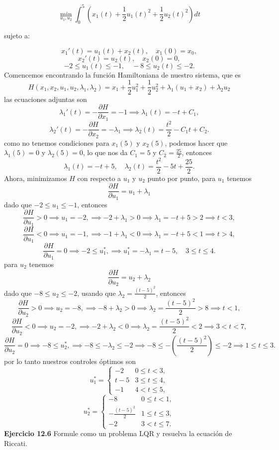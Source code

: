 \documentclass{uofa-eng-assignment}
\begin{document}
\[
\min_{u_1, u_2} \int_0^5 \left( x_1(t) + \frac{1}{2} u_1(t)^2 + \frac{1}{2} u_2(t)^2 \right) dt
\]

sujeto a:

\[
x_1'(t) = u_1(t) + x_2(t), \quad x_1(0) = x_0,
\]
\[
x_2'(t) = u_2(t), \quad x_2(0) = 0,
\]
\[
-2 \leq u_1(t) \leq -1, \quad -8 \leq u_2(t) \leq -2.
\]
Comencemos encontrando la función Hamiltoniana de nuestro sistema, que es
\[
H(x_1, x_2, u_1, u_2, \lambda_1, \lambda_2) = x_1 + \frac{1}{2}u_1^2 + \frac{1}{2}u_2^2 + \lambda_1(u_1 + x_2) + \lambda_2 u_2
\]
las ecuaciones adjuntas son
\[
\lambda_1'(t) = -\frac{\partial H}{\partial x_1} = -1 \implies \lambda_1(t) = -t + C_1,
\]
\[
\lambda_2'(t) = -\frac{\partial H}{\partial x_2} = -\lambda_1 \implies \lambda_2(t) = \frac{t^2}{2} - C_1 t + C_2.
\]
como no tenemos condiciones para $x_1(5)$ y $x_2(5)$, podemos hacer que $\lambda_1(5) = 0$ y $\lambda_2(5) = 0$, lo que nos da $C_1 = 5$ y $C_2 = \frac{25}{2}$, entonces
\[\lambda_1(t) = -t + 5, \quad \lambda_2(t) = \frac{t^2}{2} - 5t + \frac{25}{2}.\]
Ahora, minimizamos $H$ con respecto a $u_1$ y $u_2$ punto por punto, para $u_1$ tenemos
\[\frac{\partial H}{\partial u_1} = u_1 + \lambda_1\]
 dado que $-2 \leq u_1 \leq -1$, entonces
\[\frac{\partial H}{\partial u_1} >  0 \implies u_1= -2, \implies -2 + \lambda_1 > 0 \implies \lambda_1 = -t + 5 > 2 \implies t < 3,\]
\[\frac{\partial H}{\partial u_1} < 0 \implies u_1 = -1, \implies -1 + \lambda_1 < 0 \implies \lambda_1 = -t + 5 < 1 \implies t > 4,\]   
\[\frac{\partial H}{\partial u_1} = 0 \implies -2 \leq u_1^*, \implies u_1^* = -\lambda_1 = t - 5, \quad 3 \leq t \leq 4.\]
para $u_2$ tenemos
\[\frac{\partial H}{\partial u_2} = u_2 + \lambda_2\]
 dado que $-8 \leq u_2 \leq -2$, usando que $\lambda_2= \frac{(t-5)^2}{2}$, entonces
\[\frac{\partial H}{\partial u_2} >  0 \implies u_2= -8, \implies -8 + \lambda_2 > 0 \implies \lambda_2 = \frac{(t-5)^2}{2} > 8 \implies t < 1,\]
\[\frac{\partial H}{\partial u_2} < 0 \implies u_2 = -2, \implies -2 + \lambda_2 < 0 \implies \lambda_2 = \frac{(t-5)^2}{2} < 2 \implies 3 < t < 7,\]
\[\frac{\partial H}{\partial u_2} = 0 \implies -8 \leq u_2^*, \implies -8 \leq -\lambda_2 \leq -2 \implies -8 \leq -\left(\frac{(t-5)^2}{2}\right) \leq -2 \implies 1 \leq t \leq 3.\]
por lo tanto nuestros controles óptimos son
\[u_1^* = \begin{cases}
-2 & 0 \leq t < 3,\\
t - 5 & 3 \leq t \leq 4,\\
-1 & 4 < t \leq 5,
\end{cases}\]
\[u_2^* = \begin{cases}
-8 & 0 \leq t < 1,\\ 
- \frac{(t-5)^2}{2} & 1 \leq t \leq 3,\\
-2 & 3 < t \leq 7.
\end{cases}\]
\textbf{Ejercicio 12.6}  Formule como un problema LQR y resuelva la ecuación de Riccati.
\end{document}
